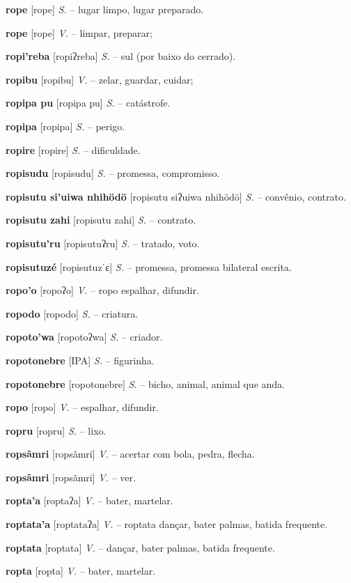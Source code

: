 \textbf{rope} [rope] \textit{S.} -- lugar limpo, lugar preparado.

\textbf{rope} [rope] \textit{V.} -- limpar, preparar;

\textbf{ropi'reba} [ropiʔreba] \textit{S.} -- sul (por baixo do cerrado).

\textbf{ropibu} [ropibu] \textit{V.} -- zelar, guardar, cuidar;

\textbf{ropipa pu} [ropipa pu] \textit{S.} -- catástrofe.

\textbf{ropipa} [ropipa] \textit{S.} -- perigo.

\textbf{ropire} [ropire] \textit{S.} -- dificuldade.

\textbf{ropisudu} [ropisudu] \textit{S.} -- promessa, compromisso.

\textbf{ropisutu si'uiwa nhihödö} [ropisutu siʔuiwa nhihödö] \textit{S.} -- convênio, contrato.

\textbf{ropisutu zahi} [ropisutu zahi] \textit{S.} -- contrato.

\textbf{ropisutu'ru} [ropisutuʔru] \textit{S.} -- tratado, voto.

\textbf{ropisutuzé} [ropisutuzˈɛ] \textit{S.} -- promessa, promessa bilateral escrita.

\textbf{ropo'o} [ropoʔo] \textit{V.} -- ropo espalhar, difundir.

\textbf{ropodo} [ropodo] \textit{S.} -- criatura.

\textbf{ropoto'wa} [ropotoʔwa] \textit{S.} -- criador.

\textbf{ropotonebre} [IPA] \textit{S.} -- figurinha.

\textbf{ropotonebre} [ropotonebre] \textit{S.} -- bicho, animal, animal que anda.

\textbf{ropo} [ropo] \textit{V.} -- espalhar, difundir.

\textbf{ropru} [ropru] \textit{S.} -- lixo.

\textbf{ropsãmri} [ropsãmri] \textit{V.} -- acertar com bola, pedra, flecha.

\textbf{ropsãmri} [ropsãmri] \textit{V.} -- ver.

\textbf{ropta'a} [roptaʔa] \textit{V.} -- bater, martelar.

\textbf{roptata'a} [roptataʔa] \textit{V.} -- roptata dançar, bater palmas, batida frequente.

\textbf{roptata} [roptata] \textit{V.} -- dançar, bater palmas, batida frequente.

\textbf{ropta} [ropta] \textit{V.} -- bater, martelar.

